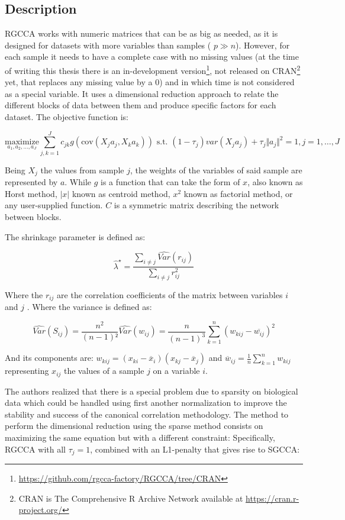 \documentclass[
  a4paper,
]{book}
\DeclareRobustCommand{\href}[2]{#2\footnote{\url{#1}}}
\begin{document}
\hypertarget{description}{%
\subsection{Description}\label{description}}

RGCCA works with numeric matrices that can be as big as needed, as it is designed for datasets with more variables than samples ( \(p \gg n\)).
However, for each sample it needs to have a complete case with no missing values (at the time of writing this thesis there is an \href{https://github.com/rgcca-factory/RGCCA/tree/CRAN}{in-development version}, not released on CRAN\footnote{CRAN is The Comprehensive R Archive Network available at \url{https://cran.r-project.org/}} yet, that replaces any missing value by a 0) and in which time is not considered as a special variable.
It uses a dimensional reduction approach to relate the different blocks of data between them and produce specific factors for each dataset.
The objective function is:

\[
\underset{a_1,a_2, \dots,a_J}{\text{maximize}} \sum_{j, k = 1}^J c_{jk} g( \text{cov}(X_j a_j, X_k a_k)) \text{ s.t. } (1-\tau_j)var(X_j a_j)+\tau_j \Vert a_j \Vert^2 = 1, j=1, \ldots, J
\]

Being \(X_j\) the values from sample \(j\), the weights of the variables of said sample are represented by \(a\).
While \(g\) is a function that can take the form of \(x\), also known as Horst method, \(|x|\) known as centroid method, \(x^2\) known as factorial method, or any user-supplied function.
\(C\) is a symmetric matrix describing the network between blocks.

The shrinkage parameter is defined as:

\[
\widehat{\lambda}^{\star} = \dfrac{\sum_{i\neq j}\widehat{Var}(r_{ij})}{\sum_{i \neq j}r_{ij}^2}
\]

Where the \(r_{ij}\) are the correlation coefficients of the matrix between variables \(i\) and \(j\) .
Where the variance is defined as:

\[
\widehat{Var}(S_{ij}) = \dfrac{n^2}{{(n-1)}²} \widehat{Var}({w}_{ij}) = \dfrac{n}{{(n-1)}^3} \sum_{k=1}^n ( w_{kij} - \overline{w_{ij}})^2
\]

And its components are: \(w_{kij}=(x_{ki}-\overline{x}_i)(x_{kj}-\overline{x}_j)\) and \(\overline{w}_{ij}=\frac{1}{n}\sum_{k=1}^nw_{kij}\) representing \(x_{ij}\) the values of a sample \(j\) on a variable \(i\).

The authors realized that there is a special problem due to sparsity on biological data which could be handled using first another normalization to improve the stability and success of the canonical correlation methodology.
The method to perform the dimensional reduction using the sparse method consists on maximizing the same equation but with a different constraint: Specifically, RGCCA with all \(\tau_j = 1\), combined with an L1-penalty that gives rise to SGCCA:
\end{document}
